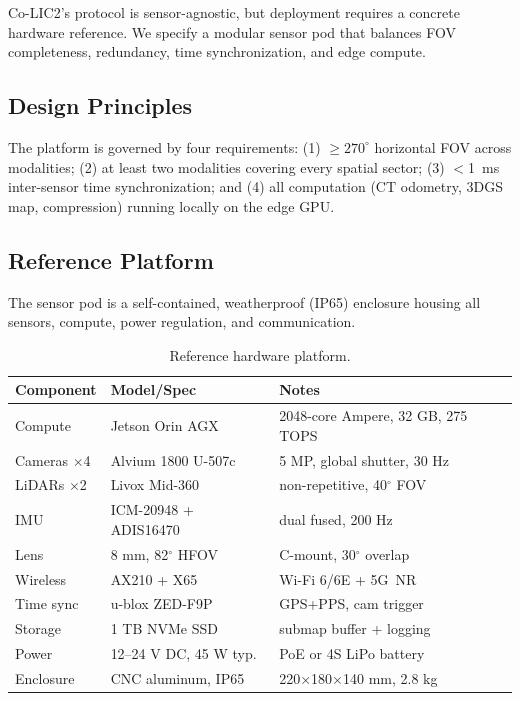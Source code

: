 \label{sec:hardware}

Co-LIC2's protocol is sensor-agnostic, but deployment requires a concrete
hardware reference. We specify a modular sensor pod that balances FOV
completeness, redundancy, time synchronization, and edge compute.

\subsection{Design Principles}

The platform is governed by four requirements: (1) $\ge 270^\circ$ horizontal
FOV across modalities; (2) at least two modalities covering every spatial
sector; (3) $<$1~ms inter-sensor time synchronization; and (4) all computation
(CT odometry, 3DGS map, compression) running locally on the edge GPU.

\subsection{Reference Platform}

The sensor pod is a self-contained, weatherproof (IP65) enclosure housing
all sensors, compute, power regulation, and communication.

\begin{table}[t]
  \centering
  \caption{Reference hardware platform.}
  \label{tab:hardware_spec}
  \footnotesize
  \setlength{\tabcolsep}{3pt}
  \begin{tabular}{@{}p{2.2cm}p{2.0cm}p{3.5cm}@{}}
    \toprule
    Component & Model/Spec & Notes \\
    \midrule
    Compute    & Jetson Orin AGX      & 2048-core Ampere, 32 GB, 275 TOPS \\
    Cameras $\times$4 & Alvium 1800 U-507c & 5 MP, global shutter, 30 Hz \\
    LiDARs $\times$2  & Livox Mid-360        & non-repetitive, 40$^\circ$ FOV \\
    IMU        & ICM-20948 + ADIS16470 & dual fused, 200 Hz \\
    Lens       & 8 mm, 82$^\circ$ HFOV  & C-mount, 30$^\circ$ overlap \\
    Wireless   & AX210 + X65             & Wi-Fi 6/6E + 5G~NR \\
    Time sync  & u-blox ZED-F9P          & GPS+PPS, cam trigger \\
    Storage    & 1 TB NVMe SSD           & submap buffer + logging \\
    Power      & 12--24 V DC, 45 W typ.\@ & PoE or 4S LiPo battery \\
    Enclosure  & CNC aluminum, IP65     & 220$\times$180$\times$140 mm, 2.8 kg \\
    \bottomrule
  \end{tabular}
\end{table}

